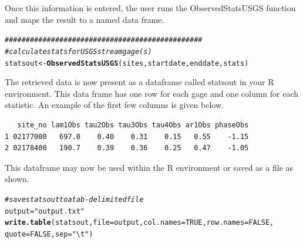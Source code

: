 \documentclass[a4paper,11pt]{article}\usepackage[]{graphicx}\usepackage[]{color}
\makeatletter
\newcommand{\hlnum}[1]{\textcolor[rgb]{0.686,0.059,0.569}{#1}}%
\newcommand{\hlstr}[1]{\textcolor[rgb]{0.192,0.494,0.8}{#1}}%
\newcommand{\hlcom}[1]{\textcolor[rgb]{0.678,0.584,0.686}{\textit{#1}}}%
\newcommand{\hlstd}[1]{\textcolor[rgb]{0.345,0.345,0.345}{#1}}%
\newcommand{\hlkwb}[1]{\textcolor[rgb]{0.69,0.353,0.396}{#1}}%
\newcommand{\hlkwc}[1]{\textcolor[rgb]{0.333,0.667,0.333}{#1}}%
\newcommand{\hlkwd}[1]{\textcolor[rgb]{0.737,0.353,0.396}{\textbf{#1}}}%
\newenvironment{kframe}{%
 \def\at@end@of@kframe{}%
 \ifinner\ifhmode%
  \def\at@end@of@kframe{\end{minipage}}%
  \begin{minipage}{\columnwidth}%
 \fi\fi%
 \def\FrameCommand##1{\hskip\@totalleftmargin \hskip-\fboxsep
 \colorbox{shadecolor}{##1}\hskip-\fboxsep
     \hskip-\linewidth \hskip-\@totalleftmargin \hskip\columnwidth}%
 \MakeFramed {\advance\hsize-\width
   \@totalleftmargin\z@ \linewidth\hsize
   \@setminipage}}%
 {\par\unskip\endMakeFramed%
 \at@end@of@kframe}
\newenvironment{knitrout}{}{} %
\makeatother
\begin{document}
Once this information is entered, the user runs the ObservedStatsUSGS function and maps the result to a named data frame.



\begin{knitrout}
\color{fgcolor}\begin{kframe}
\begin{alltt}
\hlcom{###############################################}
\hlcom{# calculate stats for USGS streamgage(s)}
\hlstd{statsout} \hlkwb{<-} \hlkwd{ObservedStatsUSGS}\hlstd{(sites,startdate,enddate,stats)}
\end{alltt}
\end{kframe}
\end{knitrout}

The retrieved data is now present as a dataframe called statsout in your R environment. This data frame has one row for each gage and one column for each statistic. An example of the first few columns is given below.

\begin{knitrout}
\color{fgcolor}\begin{kframe}
\begin{verbatim}
   site_no lam1Obs tau2Obs tau3Obs tau4Obs ar1Obs phaseObs
1 02177000   697.0    0.40    0.31    0.15   0.55    -1.15
2 02178400   190.7    0.39    0.36    0.25   0.47    -1.05
\end{verbatim}
\end{kframe}
\end{knitrout}

This dataframe may now be used within the R environment or saved as a file as shown.

\begin{knitrout}
\color{fgcolor}\begin{kframe}
\begin{alltt}
\hlcom{# save statsout to a tab-delimited file}
\hlstd{output} \hlkwb{=} \hlstr{"output.txt"}
\hlkwd{write.table}\hlstd{(statsout,} \hlkwc{file} \hlstd{= output,} \hlkwc{col.names} \hlstd{=} \hlnum{TRUE}\hlstd{,} \hlkwc{row.names} \hlstd{=} \hlnum{FALSE}\hlstd{,}
            \hlkwc{quote} \hlstd{=} \hlnum{FALSE}\hlstd{,} \hlkwc{sep} \hlstd{=} \hlstr{"\textbackslash{}t"}\hlstd{)}
\end{alltt}
\end{kframe}
\end{knitrout}
\end{document}
